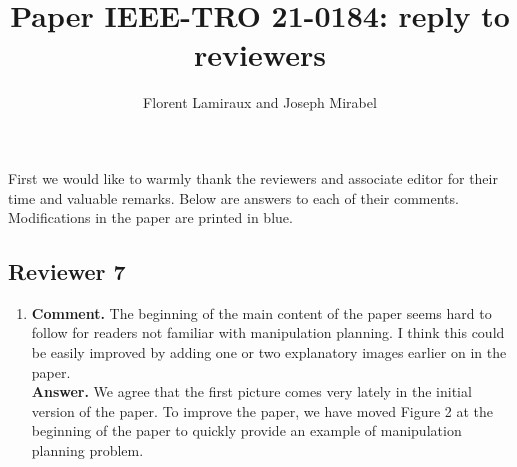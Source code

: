 \documentclass{article}
\title{Paper IEEE-TRO 21-0184: reply to reviewers}
\author{Florent Lamiraux and Joseph Mirabel}
\date{}
\begin{document}
\maketitle

First we would like to warmly thank the reviewers and associate editor for their
time and valuable remarks. Below are answers to each of their comments. Modifications in the paper are printed in blue.
\subsection*{Reviewer 7}
\begin{enumerate}
  \item \textbf{Comment.} The beginning of the main content of the
    paper seems hard to follow for readers not familiar with
    manipulation planning.  I think this could be easily improved by
    adding one or two explanatory images earlier on in the
    paper.\\
    \textbf{Answer.} We agree that the first picture comes very lately in the
    initial version of the paper. To improve the paper, we have moved Figure 2
    at the beginning of the paper to quickly provide an example of manipulation
    planning problem.
\end{enumerate}
\end{document}
